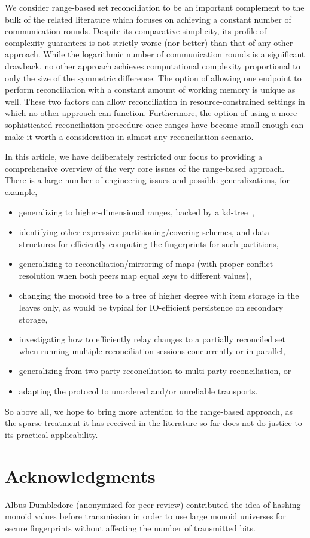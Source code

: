 \documentclass[conference]{IEEEtran}
\begin{document}
We consider range-based set reconciliation to be an important complement to the bulk of the related literature which focuses on achieving a constant number of communication rounds. Despite its comparative simplicity, its profile of complexity guarantees is not strictly worse (nor better) than that of any other approach. While the logarithmic number of communication rounds is a significant drawback, no other approach achieves computational complexity proportional to only the size of the symmetric difference. The option of allowing one endpoint to perform reconciliation with a constant amount of working memory is unique as well. These two factors can allow reconciliation in resource-constrained settings in which no other approach can function. Furthermore, the option of using a more sophisticated reconciliation procedure once ranges have become small enough can make it worth a consideration in almost any reconciliation scenario.

In this article, we have deliberately restricted our focus to providing a comprehensive overview of the very core issues of the range-based approach. There is a large number of engineering issues and possible generalizations, for example,

\begin{itemize}
	\item generalizing to higher-dimensional ranges, backed by a kd-tree~\cite{bentley1975multidimensional},
	\item identifying other expressive partitioning/covering schemes, and data structures for efficiently computing the fingerprints for such partitions,
	\item generalizing to reconciliation/mirroring of maps (with proper conflict resolution when both peers map equal keys to different values),
	\item changing the monoid tree to a tree of higher degree with item storage in the leaves only, as would be typical for IO-efficient persistence on secondary storage,
	\item investigating how to efficiently relay changes to a partially reconciled set when running multiple reconciliation sessions concurrently or in parallel,
	\item generalizing from two-party reconciliation to multi-party reconciliation, or
	\item adapting the protocol to unordered and/or unreliable transports.
\end{itemize}

So above all, we hope to bring more attention to the range-based approach, as the sparse treatment it has received in the literature so far does not do justice to its practical applicability.

\section{Acknowledgments}

Albus Dumbledore (anonymized for peer review)
 contributed the idea of hashing monoid values before transmission in order to use large monoid universes for secure fingerprints without affecting the number of transmitted bits.



\end{document}
